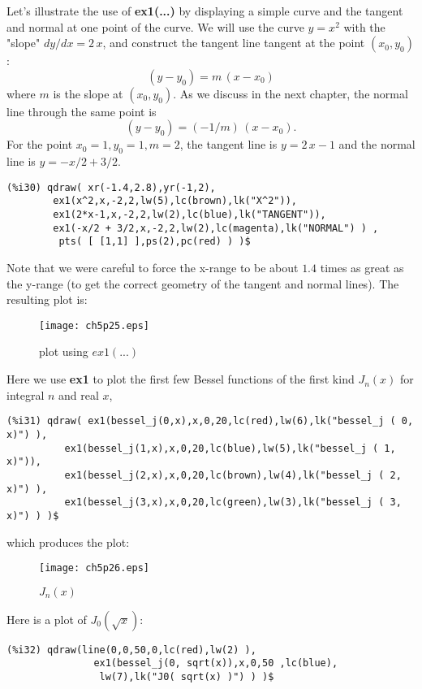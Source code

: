 \documentclass[12pt]{article}
\begin{document}
\smallskip
Let's illustrate the use of \textbf{ex1(...)} by displaying a simple curve
  and the tangent and normal at one point of the curve. 
We will use the curve $y = x^2$ with the "slope" $dy/dx = 2\,x$, and
  construct the tangent line tangent at the point $(x_0,y_0)$:
  $$  (y - y_0) = m\,(x - x_0) $$
 where $m$ is the slope at $(x_0,y_0)$.
As we discuss in the next chapter, the normal line through the same point is
$$ (y - y_0) = (-1/m) \, (x - x_0). $$
For the point $x_0 = 1, y_0 = 1, m = 2$, the tangent line is
  $y = 2\,x -1$ and the normal line is $y = -x/2 + 3/2$.
\small
\begin{verbatim}
(%i30) qdraw( xr(-1.4,2.8),yr(-1,2),
        ex1(x^2,x,-2,2,lw(5),lc(brown),lk("X^2")),
        ex1(2*x-1,x,-2,2,lw(2),lc(blue),lk("TANGENT")),
        ex1(-x/2 + 3/2,x,-2,2,lw(2),lc(magenta),lk("NORMAL") ) ,
         pts( [ [1,1] ],ps(2),pc(red) ) )$
\end{verbatim}
\normalsize
Note that we were careful to force the x-range to be about $1.4$ times as
  great as the y-range (to get the correct geometry of the tangent and
  normal lines).
The resulting plot is:
\begin{figure} [h]
   \centerline{\texttt{[image: ch5p25.eps]} }
	\caption{plot using $ex1(...)$ }
\end{figure}      


\newpage
Here we use \textbf{ex1} to plot the first few Bessel functions
  of the first kind $J_{n}(x)$ for integral $n$ and real $x$,
\small
\begin{verbatim}
(%i31) qdraw( ex1(bessel_j(0,x),x,0,20,lc(red),lw(6),lk("bessel_j ( 0, x)") ),
          ex1(bessel_j(1,x),x,0,20,lc(blue),lw(5),lk("bessel_j ( 1, x)")),
          ex1(bessel_j(2,x),x,0,20,lc(brown),lw(4),lk("bessel_j ( 2, x)") ),
          ex1(bessel_j(3,x),x,0,20,lc(green),lw(3),lk("bessel_j ( 3, x)") ) )$
\end{verbatim}
\normalsize
which produces the plot:
\begin{figure} [h]
   \centerline{\texttt{[image: ch5p26.eps]} }
	\caption{$J_{n}(x)$ }
\end{figure}      

\smallskip
Here is a plot of $J_{0}( \sqrt{x} )$:
\small
\begin{verbatim}
(%i32) qdraw(line(0,0,50,0,lc(red),lw(2) ),
               ex1(bessel_j(0, sqrt(x)),x,0,50 ,lc(blue),
                lw(7),lk("J0( sqrt(x) )") ) )$
\end{verbatim}
\normalsize
\end{document}
